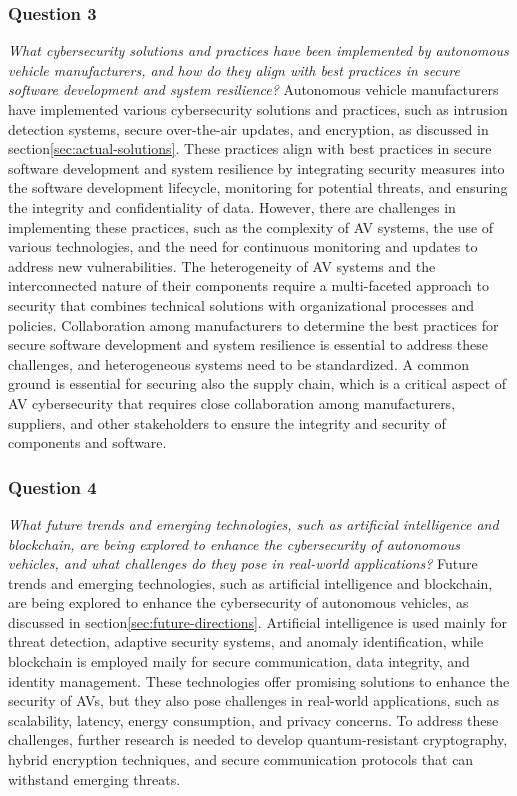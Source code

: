 \subsubsection{Question 3}
\textit{What cybersecurity solutions and practices have been implemented by autonomous vehicle manufacturers, and how do they align with best practices in secure software development and system resilience?}
Autonomous vehicle manufacturers have implemented various cybersecurity solutions and practices, such as intrusion detection systems, secure over-the-air updates, and encryption, as discussed in section\ref{sec:actual-solutions}.
These practices align with best practices in secure software development and system resilience by integrating security measures into the software development lifecycle, monitoring for potential threats, and ensuring the integrity and confidentiality of data.
However, there are challenges in implementing these practices, such as the complexity of AV systems, the use of various technologies, and the need for continuous monitoring and updates to address new vulnerabilities.
The heterogeneity of AV systems and the interconnected nature of their components require a multi-faceted approach to security
that combines technical solutions with organizational processes and policies.
Collaboration among manufacturers to determine the best practices for secure software development and system resilience is essential to address these challenges, and heterogeneous systems need to be standardized.
A common ground is essential for securing also the supply chain, which is a critical aspect of AV cybersecurity that requires close collaboration among manufacturers, suppliers, and other stakeholders to ensure the integrity and security of components and software.

\subsubsection{Question 4}
\textit{What future trends and emerging technologies, such as artificial intelligence and blockchain, are being explored to enhance the cybersecurity of autonomous vehicles, and what challenges do they pose in real-world applications?}
Future trends and emerging technologies, such as artificial intelligence and blockchain, are being explored to enhance the cybersecurity of autonomous vehicles, as discussed in section\ref{sec:future-directions}.
Artificial intelligence is used mainly for threat detection, adaptive security systems, and anomaly identification, while blockchain is employed maily for secure communication, data integrity, and identity management.
These technologies offer promising solutions to enhance the security of AVs, but they also pose challenges in real-world applications, such as scalability, latency, energy consumption, and privacy concerns.
To address these challenges, further research is needed to develop quantum-resistant cryptography, hybrid encryption techniques, and secure communication protocols that can withstand emerging threats.

